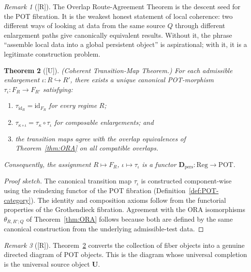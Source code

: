 \documentclass[12pt,oneside]{amsbook}
\theoremstyle{plain}
\newtheorem{theorem}{Theorem}[section]
\theoremstyle{definition}
\theoremstyle{remark}
\newtheorem{remark}[theorem]{Remark}
\newcommand{\status}[1]{\textup{[#1]}}
\begin{document}
\begin{remark}[\status{R}]\label{rmk:ORA-descent-seed}
The Overlap Route-Agreement Theorem is the descent seed for the
POT fibration.  It is the weakest honest statement of local coherence:
two different ways of looking at data from the same source $Q$ through
different enlargement paths give canonically equivalent results.  Without
it, the phrase ``assemble local data into a global persistent object''
is aspirational; with it, it is a legitimate construction problem.
\end{remark}

\begin{theorem}[\status{U}]\label{thm:CTM}
\textup{(Coherent Transition-Map Theorem.)}  For each admissible
enlargement $\iota: R \hookrightarrow R'$, there exists a unique
canonical POT-morphism $\tau_\iota: F_R \to F_{R'}$ satisfying:
\begin{enumerate}[label=\textup{(\alph*)}]
  \item $\tau_{\mathrm{id}_R} = \mathrm{id}_{F_R}$ for every regime $R$;
  \item $\tau_{\kappa \circ \iota} = \tau_\kappa \circ \tau_\iota$ for
        composable enlargements; and
  \item the transition maps agree with the overlap equivalences of
        Theorem~\ref{thm:ORA} on all compatible overlaps.
\end{enumerate}
Consequently, the assignment $R \mapsto F_R$, $\iota \mapsto \tau_\iota$
is a functor $\mathbf{D}_{\mathrm{pers}}: \mathrm{Reg} \to \mathrm{POT}$.
\end{theorem}

\begin{proof}[Proof sketch]
The canonical transition map $\tau_\iota$ is constructed component-wise
using the reindexing functor of the POT fibration (Definition~\ref{def:POT-category}).
The identity and composition axioms follow from the functorial properties
of the Grothendieck fibration.  Agreement with the ORA isomorphisms
$\theta_{R,R';Q}$ of Theorem~\ref{thm:ORA} follows because both are
defined by the same canonical construction from the underlying
admissible-test data.
\end{proof}

\begin{remark}[\status{R}]\label{rmk:CTM-directed-diagram}
Theorem~\ref{thm:CTM} converts the collection of fiber objects into a
genuine directed diagram of POT objects.  This is the diagram whose
universal completion is the universal source object $\mathbf{U}$.
\end{remark}
\end{document}
